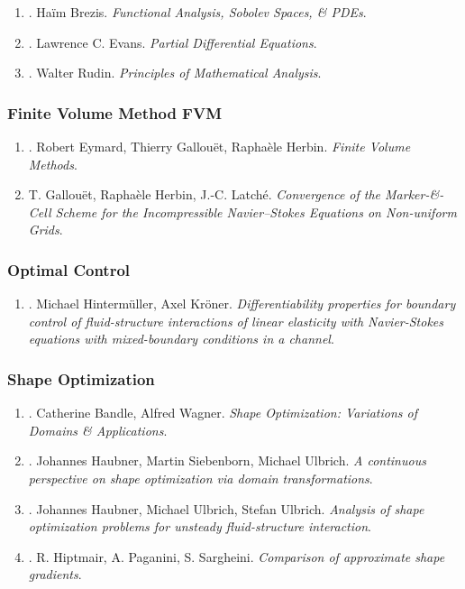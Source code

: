 \documentclass{article}
\begin{document}
\begin{enumerate}
	\item \cite{Brezis2011}. Ha\"im Brezis. \textit{Functional Analysis, Sobolev Spaces, \& PDEs}.\hfill{\sf[reading]}
	\item \cite{Evans2010}. Lawrence C. Evans. \textit{Partial Differential Equations}.\hfill{\sf[reading]}
	\item \cite{Rudin1976}. Walter Rudin. \textit{Principles of Mathematical Analysis}.\hfill{\sf[done]}
\end{enumerate}

\subsubsection{Finite Volume Method FVM}

\begin{enumerate}
	\item \cite{Eymard_Gallouet_Herbin2019}. Robert Eymard, Thierry Gallou\"et, Rapha\`ele Herbin. \textit{Finite Volume Methods}.\hfill{\sf[reading]}
	\item T. Gallou\"et, Rapha\`ele Herbin, J.-C. Latch\'e. \textit{Convergence of the Marker-\&-Cell Scheme for the Incompressible Navier--Stokes Equations on Non-uniform Grids}.\hfill{\sf[reading]}
\end{enumerate}

\subsubsection{Optimal Control}

\begin{enumerate}
	\item \cite{Hintermueller_Kroener2023}. Michael Hinterm\"uller, Axel Kr\"oner. \textit{Differentiability properties for boundary control of fluid-structure interactions of linear elasticity with Navier-Stokes equations with mixed-boundary conditions in a channel}.\hfill{\sf[done]}
\end{enumerate}

\subsubsection{Shape Optimization}

\begin{enumerate}
	\item \cite{Bandle_Wagner2023}. Catherine Bandle, Alfred Wagner. \textit{Shape Optimization: Variations of Domains \& Applications}.\hfill{\sf[reading]}
	\item \cite{Haubner_Siebenborn_Ulbrich2021}. Johannes Haubner, Martin Siebenborn, Michael Ulbrich. \textit{A continuous perspective on shape optimization via domain transformations}.\hfill{\sf[done]}
	\item \cite{Haubner_Ulbrich_Ulbrich2020}. Johannes Haubner, Michael Ulbrich, Stefan Ulbrich. \textit{Analysis of shape optimization problems for unsteady fluid-structure interaction}.\hfill{\sf[done]}
	\item \cite{Hiptmair_Paganini_Sargheini2015}. R. Hiptmair, A. Paganini, S. Sargheini. \textit{Comparison of approximate shape gradients}.\hfill{\sf[done]}
\end{enumerate}
\end{document}
